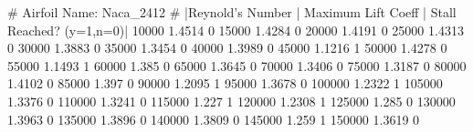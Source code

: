 # Airfoil Name: Naca_2412
# |Reynold's Number | Maximum Lift Coeff | Stall Reached? (y=1,n=0)|
10000 1.4514 0
15000 1.4284 0
20000 1.4191 0
25000 1.4313 0
30000 1.3883 0
35000 1.3454 0
40000 1.3989 0
45000 1.1216 1
50000 1.4278 0
55000 1.1493 1
60000 1.385 0
65000 1.3645 0
70000 1.3406 0
75000 1.3187 0
80000 1.4102 0
85000 1.397 0
90000 1.2095 1
95000 1.3678 0
100000 1.2322 1
105000 1.3376 0
110000 1.3241 0
115000 1.227 1
120000 1.2308 1
125000 1.285 0
130000 1.3963 0
135000 1.3896 0
140000 1.3809 0
145000 1.259 1
150000 1.3619 0
